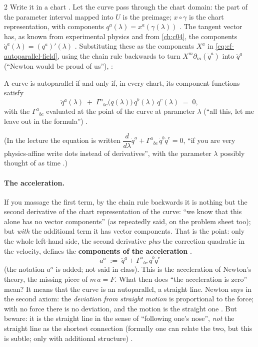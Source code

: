 \begin{paracol}{2}
Write it in a chart . Let the curve pass through the chart domain: the part of the parameter interval mapped into $U$ is
the preimage; $x\circ\gamma$ is the chart representation, with components $q^a(\lambda)=x^a(\gamma(\lambda))$
. The tangent vector has, as known from experimental physics and from \cref{ch:c04}, the components
$\dot q^a(\lambda)=(q^a)'(\lambda)$ . Substituting these as the components $X^a$ in \eqref{eq:cf-autoparallel-field},
using the chain rule backwards to turn $X^m\partial_m(\dot q^a)$ into $\ddot q^a$ (``Newton would be proud of us''),
:
\begin{theorem}\label{thm:cf-autoparallel}
A curve is autoparallel if and only if, in every chart, its component functions satisfy
\[
  \ddot q^a(\lambda)\;+\;\Gamma^a{}_{bc}\bigl(q(\lambda)\bigr)\,\dot q^b(\lambda)\,\dot q^c(\lambda)\;=\;0 ,
\]
with the $\Gamma^a{}_{bc}$ evaluated at the point of the curve at parameter $\lambda$ (``all this, let me leave out in the formula'')
.
\end{theorem}
(In the lecture the equation is written $\dfrac{d}{d\lambda}\dot q^a+\Gamma^a{}_{bc}\,\dot q^b\dot q^c=0$, ``if you are very
physics-affine write dots instead of derivatives'', with the parameter $\lambda$ possibly thought of as time .)

\paragraph{The acceleration.} If you massage the first term, by the chain rule backwards it is nothing but the second derivative of the chart
representation of the curve: ``we know that this alone has no vector components'' (as repeatedly said, on the problem sheet too); but
\emph{with} the additional term it has vector components. That is the point: only the whole left-hand side, the second derivative \emph{plus}
the correction quadratic in the velocity, defines the \textbf{components of the acceleration} .
\begin{equation*}
  a^a\;:=\;\ddot q^a+\Gamma^a{}_{bc}\,\dot q^b\dot q^c
\end{equation*}
(the notation $a^a$ is added; not said in class). This is the acceleration of Newton's theory, the missing piece of $m\,a=F$.
What then does ``the acceleration is zero'' mean? It means that the curve is an autoparallel, a straight line. Newton says in the second
axiom: the \emph{deviation from straight motion} is proportional to the force; with no force there is no deviation, and the motion is
the straight one .
But beware: it is the straight line in the sense of ``following one's nose'', \emph{not} the straight line as the shortest
connection (formally one can relate the two, but this is subtle; only with additional structure) .


\end{paracol}
